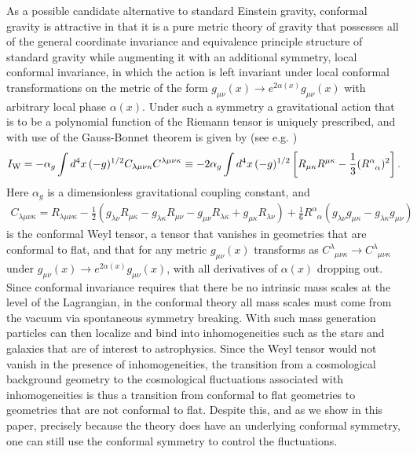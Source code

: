 \documentclass[aps]{revtex4}
\begin{document}
As a possible candidate alternative to standard Einstein gravity, conformal gravity is attractive in that it is a pure metric theory of gravity that possesses all of the general coordinate invariance and equivalence principle structure of standard gravity while augmenting it with an additional symmetry, local conformal invariance, in which  the action is left invariant under local conformal transformations on the metric of the form $g_{\mu\nu}(x)\rightarrow e^{2\alpha(x)}g_{\mu\nu}(x)$ with arbitrary local phase $\alpha(x)$. Under such a symmetry a gravitational action that is to be a polynomial function of the Riemann tensor is uniquely prescribed, and with use of the Gauss-Bonnet theorem is given by (see e.g. \cite{Mannheim2006}) 
%
\begin{eqnarray}
I_{\rm W}=-\alpha_g\int d^4x\, (-g)^{1/2}C_{\lambda\mu\nu\kappa}
C^{\lambda\mu\nu\kappa}
\equiv -2\alpha_g\int d^4x\, (-g)^{1/2}\left[R_{\mu\kappa}R^{\mu\kappa}-\frac{1}{3} (R^{\alpha}_{\phantom{\alpha}\alpha})^2\right].
\label{AP1}
\end{eqnarray}
% 
Here $\alpha_g$ is a dimensionless  gravitational coupling constant, and
%
\begin{eqnarray}
C_{\lambda\mu\nu\kappa}= R_{\lambda\mu\nu\kappa}
-\frac{1}{2}\left(g_{\lambda\nu}R_{\mu\kappa}-
g_{\lambda\kappa}R_{\mu\nu}-
g_{\mu\nu}R_{\lambda\kappa}+
g_{\mu\kappa}R_{\lambda\nu}\right)
+\frac{1}{6}R^{\alpha}_{\phantom{\alpha}\alpha}\left(
g_{\lambda\nu}g_{\mu\kappa}-
g_{\lambda\kappa}g_{\mu\nu}\right)
\label{AP2}
\end{eqnarray}
% 
is the conformal Weyl tensor,  a tensor that vanishes in geometries that are conformal to flat,  and that for any metric $g_{\mu\nu}(x)$ transforms as  $C^{\lambda}_{\phantom{\lambda}\mu\nu\kappa} \rightarrow  C^{\lambda}_{\phantom{\lambda}\mu\nu\kappa}$ under $g_{\mu\nu}(x)\rightarrow e^{2\alpha(x)}g_{\mu\nu}(x)$, with all derivatives of $\alpha(x)$ dropping out. Since conformal invariance requires that there be no intrinsic mass scales at the level of the Lagrangian, in the conformal theory all mass scales must come from the vacuum via spontaneous symmetry breaking. With such mass generation particles can then localize and bind into inhomogeneities such as the stars and galaxies that are of interest to astrophysics. Since the Weyl tensor would not vanish in the presence of  inhomogeneities, the transition from a cosmological background geometry to the cosmological fluctuations associated with inhomogeneities is thus a transition from conformal to flat geometries to geometries that are not conformal to flat. Despite this, and as we show in this paper, precisely because the theory does have an underlying conformal symmetry, one can still use the conformal symmetry to control the fluctuations.
\end{document}
